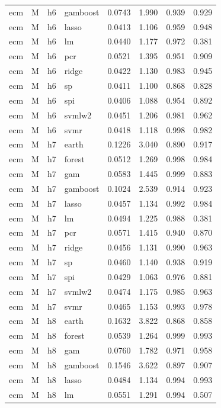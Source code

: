 \begin{ThreePartTable}
\begin{longtable}[t]{llclcccc}
ecm & M & h6 & gamboost & 0.0743 & 1.990 & 0.939 & 0.929\\
ecm & M & h6 & lasso & 0.0413 & 1.106 & 0.959 & 0.948\\
ecm & M & h6 & lm & 0.0440 & 1.177 & 0.972 & 0.381\\
ecm & M & h6 & pcr & 0.0521 & 1.395 & 0.951 & 0.909\\
ecm & M & h6 & ridge & 0.0422 & 1.130 & 0.983 & 0.945\\
ecm & M & h6 & sp & 0.0411 & 1.100 & 0.868 & 0.828\\
ecm & M & h6 & spi & 0.0406 & 1.088 & 0.954 & 0.892\\
ecm & M & h6 & svmlw2 & 0.0451 & 1.206 & 0.981 & 0.962\\
ecm & M & h6 & svmr & 0.0418 & 1.118 & 0.998 & 0.982\\
\addlinespace
ecm & M & h7 & earth & 0.1226 & 3.040 & 0.890 & 0.917\\
ecm & M & h7 & forest & 0.0512 & 1.269 & 0.998 & 0.984\\
ecm & M & h7 & gam & 0.0583 & 1.445 & 0.999 & 0.883\\
ecm & M & h7 & gamboost & 0.1024 & 2.539 & 0.914 & 0.923\\
ecm & M & h7 & lasso & 0.0457 & 1.134 & 0.992 & 0.984\\
ecm & M & h7 & lm & 0.0494 & 1.225 & 0.988 & 0.381\\
ecm & M & h7 & pcr & 0.0571 & 1.415 & 0.940 & 0.870\\
ecm & M & h7 & ridge & 0.0456 & 1.131 & 0.990 & 0.963\\
ecm & M & h7 & sp & 0.0460 & 1.140 & 0.938 & 0.919\\
ecm & M & h7 & spi & 0.0429 & 1.063 & 0.976 & 0.881\\
ecm & M & h7 & svmlw2 & 0.0474 & 1.175 & 0.985 & 0.963\\
ecm & M & h7 & svmr & 0.0465 & 1.153 & 0.993 & 0.978\\
\addlinespace
ecm & M & h8 & earth & 0.1632 & 3.822 & 0.868 & 0.858\\
ecm & M & h8 & forest & 0.0539 & 1.264 & 0.999 & 0.993\\
ecm & M & h8 & gam & 0.0760 & 1.782 & 0.971 & 0.958\\
ecm & M & h8 & gamboost & 0.1546 & 3.622 & 0.897 & 0.907\\
ecm & M & h8 & lasso & 0.0484 & 1.134 & 0.994 & 0.993\\
ecm & M & h8 & lm & 0.0551 & 1.291 & 0.994 & 0.507\\

\end{longtable}
\end{ThreePartTable}
